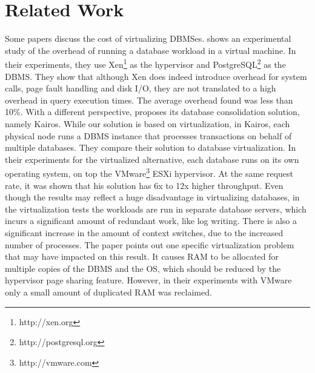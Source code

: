 \chapter{\textbf{Related Work}}

\label{chap:relwork}

Some papers discuss the cost of virtualizing DBMSes. \cite{4498282} shows an experimental study of the overhead of running a database workload in a virtual machine. In their experiments, they use Xen\footnote{http://xen.org} as the hypervisor and PostgreSQL\footnote{http://postgresql.org} as the DBMS. They show that although Xen does indeed introduce overhead for system calls, page fault handling and disk I/O, they are not translated to a high overhead in query execution times. The average overhead found was less than 10\%.  With a different perspective, \cite{Curino:2011:WDM:1989323.1989357} proposes its database consolidation solution, namely Kairos. While our solution is based on virtualization, in Kairos, each physical node runs a DBMS instance that processes transactions on behalf of multiple databases. They compare their solution to database virtualization. In their experiments for the virtualized alternative, each database runs on its own operating system, on top the VMware\footnote{http://vmware.com} 
ESXi hypervisor. At the same request rate, it was shown that his solution has 6x to 12x higher throughput. Even though the results may reflect a huge disadvantage in virtualizing databases, in the virtualization tests the workloads are run in separate database servers, which incurs a significant amount of redundant work, like log writing. There is also a significant increase in the amount of context switches, due to the increased number of processes. The paper points out one specific virtualization problem that may have impacted on this result. It causes RAM to be allocated for multiple copies of the DBMS and the OS, which should be reduced by the hypervisor page sharing feature. However, in their experiments with VMware only a small amount of duplicated RAM was reclaimed.

